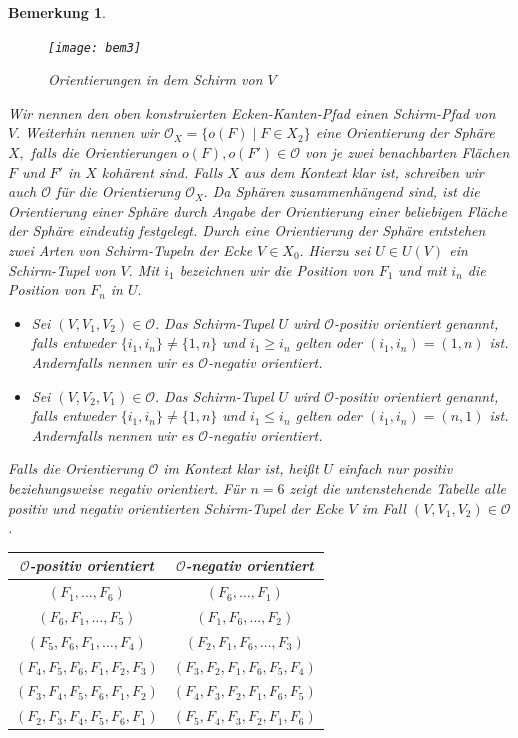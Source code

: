 \documentclass[12pt,titlepage,twoside,cleardoublepage]{article}
\theoremstyle{nummermitklammern}
\newtheorem{bemerkung}[temp]{Bemerkung}
\newtheorem{bemerkung}[zahl]{Bemerkung}
\numberwithin{equation}{section}
\begin{document}
\begin{bemerkung}
\begin{figure}[H]
\begin{center}
\texttt{[image: bem3]}
\end{center}
\caption{Orientierungen in dem Schirm von $V$}
\end{figure}
Wir nennen den oben konstruierten Ecken-Kanten-Pfad einen \emph{Schirm-Pfad} von $V.$
Weiterhin nennen wir $\mathcal{O}_X=\{o(F)\mid F\in X_2\}$ eine Orientierung der Sphäre $X,$ falls die Orientierungen $o(F),o(F')\in \mathcal{O}$ von je zwei benachbarten Flächen $F$ und $F'$ in $X$ kohärent sind. Falls $X$ aus dem Kontext klar ist, schreiben wir auch $\mathcal{O}$ für die Orientierung $\mathcal{O}_X.$ Da Sphären zusammenhängend sind, ist die  Orientierung einer Sphäre durch Angabe der Orientierung einer beliebigen Fläche der Sphäre eindeutig festgelegt. Durch eine Orientierung der Sphäre  entstehen zwei Arten von Schirm-Tupeln der Ecke $V\in X_0.$ Hierzu sei $U\in U(V)$ ein Schirm-Tupel von $V.$ Mit $i_1$ bezeichnen wir die Position von $F_1$ und mit $i_n$ die Position von $F_n$ in $U.$
\begin{itemize}
\item Sei
$(V,V_1,V_2)\in \mathcal{O}.$ Das Schirm-Tupel $U$ wird $\mathcal{O}$-\emph{positiv orientiert} genannt, falls entweder $\{i_1,i_n\}\neq\{1,n\}$ und $i_1\geq i_n$ gelten oder $(i_1,i_n)=(1,n)$ ist. Andernfalls nennen wir es $\mathcal{O}$-\emph{negativ orientiert}.
\item Sei $(V,V_2,V_1)\in \mathcal{O}.$ Das Schirm-Tupel $U$ wird $\mathcal{O}$-\emph{positiv orientiert} genannt, falls entweder $\{i_1,i_n\}\neq \{1,n\}$ und $i_1\leq i_n$ gelten oder $(i_1,i_n)=(n,1)$ ist. Andernfalls nennen wir es $\mathcal{O}$-\emph{negativ orientiert}.
 \end{itemize}
Falls die Orientierung $\mathcal{O}$ im Kontext klar ist, heißt $U$ einfach nur positiv beziehungsweise negativ orientiert.
Für $n=6$ zeigt die untenstehende Tabelle alle positiv und negativ orientierten Schirm-Tupel der Ecke $V$ im Fall $(V,V_1,V_2) \in \mathcal{O}$.\\
\begin{center}
\begin{tabular}{|c|c|}
\hline
$\mathcal{O}$-positiv orientiert & $\mathcal{O}$-negativ orientiert\\
\hline
$(F_1,\ldots,F_6)$&$(F_6,\ldots ,F_1)$\\
$(F_6,F_1,\ldots,F_5)$&$(F_1,F_6,\ldots ,F_2)$\\
$(F_5,F_6,F_1,\ldots,F_4)$&$(F_2,F_1,F_6,\ldots,F_3)$\\
$(F_4,F_5,F_6,F_1,F_2,F_3)$&$(F_3,F_2,F_1,F_6,F_5,F_4)$\\
$(F_3,F_4,F_5,F_6,F_1,F_2)$&$(F_4,F_3,F_2,F_1,F_6,F_5)$\\
$(F_2,F_3,F_4,F_5,F_6,F_1)$&$(F_5,F_4,F_3,F_2,F_1,F_6)$\\
\hline
\end{tabular}
\end{center}
\end{bemerkung}
\end{document}
